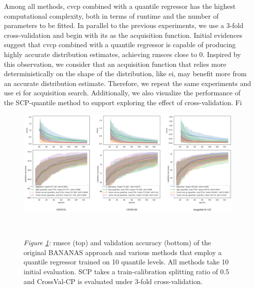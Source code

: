 \documentclass[a4paper,oneside,bibliography=totoc]{scrbook}
\begin{document}
\begin{description}[leftmargin=0cm, listparindent=\parindent]
 	\item[Performance for \gls{cvcp}:] Among all methods, \gls{cvcp} combined with a quantile regressor has the highest computational complexity, both in terms of runtime and the number of parameters to be fitted. In parallel to the previous experiments, we use a 3-fold cross-validation and begin with \gls{its} as the acquisition function. Initial evidences suggest that \gls{cvcp} combined with a quantile regressor is capable of producing highly accurate distribution estimates, achieving \gls{rmsce}s close to 0. Inspired by this observation, we consider that an acquisition function that relies more deterministically on the shape of the distribution, like \gls{ei}, may benefit more from an accurate distribution estimate. Therefore, we repeat the same experiments and use \gls{ei} for acquisition search. Additionally, we also visualize the performance of the SCP-quantile method to support exploring the effect of cross-validation. Fi
 	
 	    \vspace{0.7em}
		\begin{figure}[H]
			\centering
			\includegraphics[scale=0.37 ]{figs/cvcp_quantile.png}
			\label{fig: cvcp_quantile}
			\\
 			\parbox{\linewidth}{
 			\vspace{0.5em}
  			{\small \textit{Figure \ref{fig: cvcp_quantile}:} \gls{rmsce} (top) and validation accuracy (bottom) of the original BANANAS approach and various methods that employ a quantile regressor trained on 10 quantile levels. All methods take 10 initial evaluation. SCP takes a train-calibration splitting ratio of 0.5 and CrossVal-CP is evaluated under 3-fold cross-validation.}
 	 	}	
		\end{figure}	
 	\vspace{0.2em}
 	

\end{description}
\end{document}

